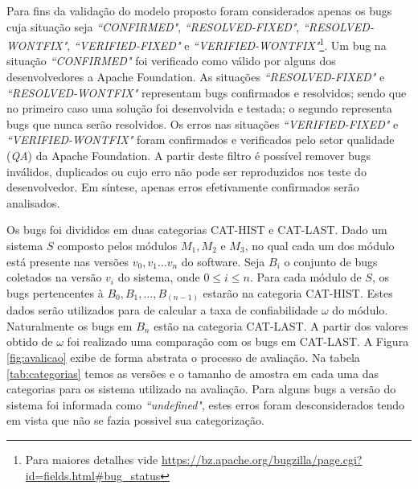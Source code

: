 \documentclass[12pt]{article}
\begin{document}
Para fins da validação do modelo proposto foram considerados apenas os bugs cuja situação seja \textit{``CONFIRMED"}, \textit{``RESOLVED-FIXED"}, \textit{``RESOLVED-WONTFIX"}, \textit{``VERIFIED-FIXED"} e \textit{``VERIFIED-WONTFIX"}\footnote{Para maiores detalhes vide \url{https://bz.apache.org/bugzilla/page.cgi?id=fields.html#bug_status}}. Um bug na situação \textit{``CONFIRMED"} foi verificado como válido por alguns dos desenvolvedores a Apache Foundation. As situações \textit{``RESOLVED-FIXED"} e  \textit{``RESOLVED-WONTFIX"} representam bugs  confirmados e resolvidos; sendo que no primeiro caso uma solução foi desenvolvida e testada; o segundo representa bugs que nunca serão resolvidos. Os erros nas situações \textit{``VERIFIED-FIXED"} e \textit{``VERIFIED-WONTFIX"} foram confirmados e verificados pelo setor qualidade (\textit{QA}) da Apache Foundation. A partir deste filtro é possível remover bugs inválidos, duplicados ou cujo erro não pode ser reproduzidos nos teste do desenvolvedor. Em síntese, apenas erros efetivamente confirmados serão analisados.

Os bugs foi divididos em duas categorias \textsc{CAT-HIST} e \textsc{CAT-LAST}.
Dado um sistema $S$ composto pelos módulos $M_1, M_2$ e $M_3$, no qual cada um
dos módulo está presente nas versões $v_0, v_1 \ldots v_n$ do software.  Seja
$B_i$ o conjunto de bugs coletados na versão $v_i$ do sistema, onde $0 \leq i
\leq n${}. Para cada módulo de $S$, os bugs pertencentes à $B_0, B_1, \ldots,
B_{(n-1)}$  estarão na categoria \textsc{CAT-HIST}. Estes dados serão utilizados
para de calcular a taxa de confiabilidade $\omega$ do módulo. Naturalmente os
bugs em $B_n$ estão na categoria \textsc{CAT-LAST}. A partir dos valores obtido
de $\omega$ foi realizado uma comparação com os bugs em \textsc{CAT-LAST}. A
Figura \ref{fig:avalicao} exibe de forma abstrata o processo de avaliação. Na
tabela \ref{tab:categorias}{} temos as versões e o tamanho de amostra em cada
uma das categorias para os sistema utilizado na avaliação. Para alguns bugs a
versão do sistema foi informada como \textit{``undefined"}, estes erros foram
desconsiderados tendo em vista que não se fazia possivel sua categorização.
\end{document}
